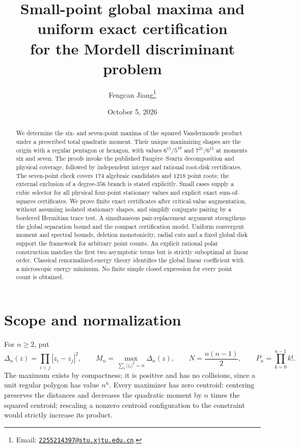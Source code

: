 \documentclass[11pt]{article}
\title{Small-point global maxima and uniform exact certification\\for the Mordell discriminant problem}
\author{Fengcan Jiang\thanks{Email:
\href{mailto:2255214397@stu.xjtu.edu.cn}{\texttt{2255214397@stu.xjtu.edu.cn}}.}}
\date{October 5, 2026}
\theoremstyle{remark}
\numberwithin{equation}{section}
\begin{document}
\maketitle
\begin{abstract}
We determine the six- and seven-point maxima of the squared Vandermonde
product under a prescribed total quadratic moment. Their unique maximizing
shapes are the origin with a regular pentagon or hexagon, with values
$6^{15}/5^{10}$ and $7^{21}/6^{15}$ at moments six and seven.
The proofs invoke the published Faug\`ere--Svartz decomposition and physical
coverage, followed by independent integer and rational root-disk certificates.
The seven-point check covers $174$ algebraic candidates and $1218$ point roots;
the external exclusion of a degree-$356$ branch is stated explicitly.
Small cases supply a cubic selector for all physical four-point stationary
values and explicit exact sum-of-squares certificates.
We prove finite exact certificates after critical-value augmentation, without
assuming isolated stationary shapes, and simplify conjugate pairing by a
bordered Hermitian trace test. A simultaneous pair-replacement argument
strengthens the global separation bound and the compact certification model.
Uniform convergent moment and spectral bounds, deletion monotonicity, radial
cuts and a fixed global disk support the framework for arbitrary point counts.
An explicit rational polar construction matches the first two asymptotic
terms but is strictly suboptimal at linear order. Classical renormalized-energy
theory identifies the global linear coefficient with a microscopic energy
minimum. No finite simple closed expression for every point count is obtained.
\end{abstract}

\section{Scope and normalization}
For $n\ge2$, put
\[
 \Delta_n(z)=\prod_{i<j}|z_i-z_j|^2,\qquad
 M_n=\max_{\sum_i|z_i|^2=n}\Delta_n(z),\qquad
 N=\frac{n(n-1)}2,\qquad P_n=\prod_{k=0}^{n-1}k!.
\]
The maximum exists by compactness; it is positive and has no
collisions, since a unit regular polygon has value $n^n$.
Every maximizer has zero centroid: centering preserves the distances
and decreases the quadratic moment by $n$ times the squared centroid;
rescaling a nonzero centroid configuration to the constraint would
strictly increase its product.
\end{document}
